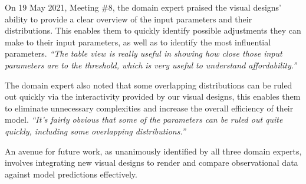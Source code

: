On 19 May 2021, Meeting \#8, the domain expert praised the visual designs' ability to provide a clear overview of the input parameters and their distributions. This enables them to quickly identify possible adjustments they can make to their input parameters, as well as to identify the most influential parameters.
\textit{
``The table view is really useful in showing how close those input parameters are to the threshold, which is very useful to understand affordability.''
}

The domain expert also noted that some overlapping distributions can be ruled out quickly via the interactivity provided by our visual designs, this enables them to eliminate unnecessary complexities and increase the overall efficiency of their model.
\textit{
``It's fairly obvious that some of the parameters can be ruled out quite quickly, including some overlapping distributions.''
}

An avenue for future work, as unanimously identified by all three domain experts, involves integrating new visual designs to render and compare observational data against model predictions effectively.
